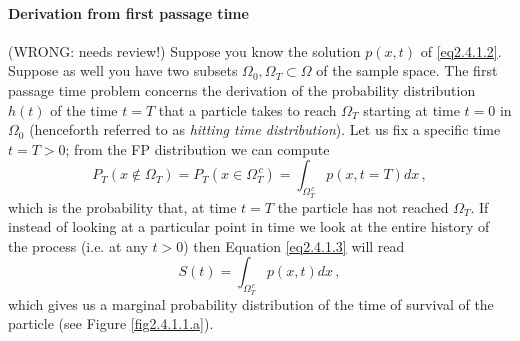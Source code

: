 \documentclass[../main.tex]{subfiles}
\begin{document}
\paragraph{Derivation from first passage time}
\color{red}
(WRONG: needs review!)
\newline
Suppose you know the solution $p(x,t)$ of \eqref{eq2.4.1.2}. Suppose as well you have two subsets $\Omega_{0},\Omega_{T}\subset\Omega$ of the sample space.
The first passage time problem concerns the derivation of the probability distribution $h(t)$ of the time $t=T$ that a particle takes to reach $\Omega_{T}$ starting at time $t=0$ in $\Omega_{0}$ (henceforth referred to as \textit{hitting time distribution}).
Let us fix a specific time $t=T>0$; from the FP distribution we can compute
\begin{equation}\label{eq2.4.1.3}
     P_{T}(x\not\in \Omega_{T})=P_{T}(x\in \Omega_{T}^{\,c}) = \int_{\Omega_{T}^{\,c}}^{}p(x,t=T)dx\,,
\end{equation}
which is the probability that, at time $t=T$ the particle has not reached $\Omega_{T}$.
If instead of looking at a particular point in time we look at the entire history of the process (i.e. at any $t>0$) then Equation \eqref{eq2.4.1.3} will read
\begin{equation}\label{eq2.4.1.4}
     S(t) = \int_{\Omega_{T}^{\,c}}^{}p(x,t)dx\,,
\end{equation}
which gives us a marginal probability distribution of the time of survival of the particle (see Figure \ref{fig2.4.1.1.a}).
\end{document}
